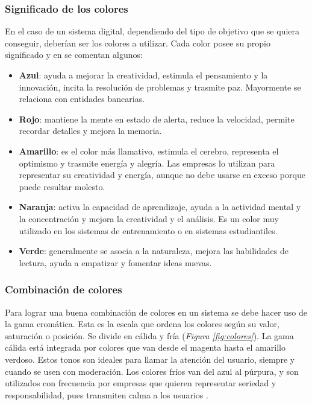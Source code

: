 \subsubsection{Significado de los colores}
En el caso de un sistema digital, dependiendo del tipo de objetivo que se quiera conseguir, deberían ser los colores a utilizar. Cada color posee su propio significado y en \cite{TerronLopez2022} se comentan algunos:

\begin{itemize}
\item \textbf{Azul}: ayuda a mejorar la creatividad, estimula el pensamiento y la innovación, incita la resolución de problemas y trasmite paz. Mayormente se relaciona con entidades bancarias.
\item \textbf{Rojo}: mantiene la mente en estado de alerta, reduce la velocidad, permite recordar detalles y mejora la memoria.
\item \textbf{Amarillo}: es el color más llamativo, estimula el cerebro, representa el optimismo y trasmite energía y alegría. Las empresas lo utilizan para representar su creatividad y energía, aunque no debe usarse en exceso porque puede resultar molesto.
\item \textbf{Naranja}: activa la capacidad de aprendizaje, ayuda a la actividad mental y la concentración y mejora la creatividad y el análisis. Es un color muy utilizado en los sistemas de entrenamiento o en sistemas estudiantiles.
\item \textbf{Verde}: generalmente se asocia a la naturaleza, mejora las habilidades de lectura, ayuda a empatizar y fomentar ideas nuevas.
\end{itemize}

\subsubsection{Combinación de colores}
Para lograr una buena combinación de colores en un sistema se debe hacer uso de la gama cromática. Esta es la escala que ordena los colores según su valor, saturación o posición. Se divide en cálida y fría (\textsl{Figura \ref{fig:colores}}). La gama cálida está integrada por colores que van desde el magenta hasta el amarillo verdoso. Estos tonos son ideales para llamar la atención del usuario, siempre y cuando se usen con moderación. Los colores fríos van del azul al púrpura, y son utilizados con frecuencia por empresas que quieren representar seriedad y responsabilidad, pues transmiten calma a los usuarios \cite{TerronLopez2022} .

